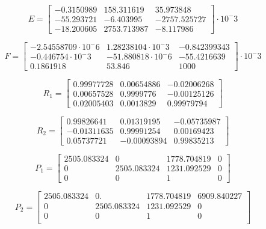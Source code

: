 \begin{appendices}
\begin{equation}\label{eq::E}
E = \begin{bmatrix}
-0.3150989 & 158.311619 & 35.973848 \\
-55.293721 & -6.403995 & -2757.525727 \\
-18.200605 & 2753.713987 & -8.117986
\end{bmatrix}\cdot10^-3
\end{equation}

\begin{equation}\label{eq::F}
F = \begin{bmatrix}
-2.54558709\cdot10^-6 & 1.28238104\cdot10^-3 & -0.842399343\\
-0.446754\cdot10^-3 & -51.880818\cdot10^-6 & -55.4216639\\
0.1861918 & 53.846 & 1000
\end{bmatrix}\cdot10^-3
\end{equation}

\begin{equation}\label{eq::R1}
R_1 = \begin{bmatrix}
0.99977728 & 0.00654886 & -0.02006268\\
0.00657528 & 0.9999776 & -0.00125126\\
0.02005403 & 0.0013829 & 0.99979794
\end{bmatrix}
\end{equation}

\begin{equation}\label{eq::R2}
R_2 = \begin{bmatrix}
0.99826641 & 0.01319195 & -0.05735987\\
-0.01311635 & 0.99991254 & 0.00169423\\
0.05737721 & -0.00093894 & 0.99835213
\end{bmatrix}
\end{equation}

\begin{equation}\label{eq::P1}
P_1 = \begin{bmatrix}
2505.083324 & 0 & 1778.704819 & 0\\
0 & 2505.083324 & 1231.092529  & 0\\
0 & 0 & 1 & 0
\end{bmatrix}
\end{equation}

\begin{equation}\label{eq::P2}
P_2 = \begin{bmatrix}
2505.083324 &    0.       & 1778.704819 & 6909.840227\\
 0          & 2505.083324 & 1231.092529 &    0        \\
 0          &    0        &    1        &    0         \\
\end{bmatrix}
\end{equation}


\end{appendices}
